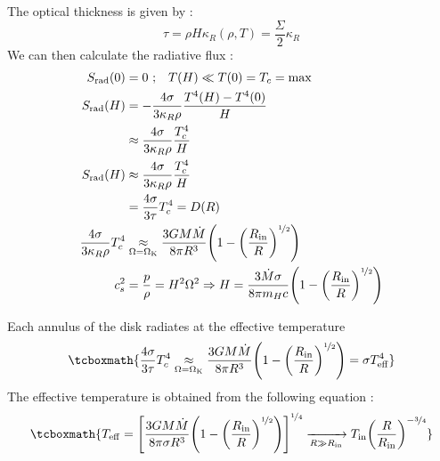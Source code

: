 \documentclass[10pt,a4paper,english]{article}
\let\originalleft\left
\let\originalright\right
\renewcommand{\left}{\mathopen{}\mathclose\bgroup\originalleft}
\renewcommand{\right}{\aftergroup\egroup\originalright}
\begin{document}
The optical thickness is given by :
\begin{equation}
    \tau = \rho H \kappa_R(\rho ,T) = \frac{\Sigma}{2} \kappa_R
\end{equation}
We can then calculate the radiative flux :
\begin{align}
    S_\mathrm{rad}(0)   & = 0 \ \mathrm{;}\quad T(H) \ll T(0) = T_c = \mathrm{max}  \\
    S_\mathrm{rad}(H) & = -\frac{4\sigma}{3\kappa_R \rho}\frac{T^4(H)-T^4(0)}{H} \\
                        & \approx \frac{4\sigma}{3\kappa_R \rho}\frac{T^4_c}{H} \\
    S_\mathrm{rad}(H) & \approx  \frac{4\sigma}{3\kappa_R \rho}\frac{T^4_c}{H}  \\
                        & = \frac{4\sigma}{3\tau}T_c^4 = D(R) \\
    \frac{4\sigma}{3\kappa_R \rho}T^4_c & \underset{\mathrm{\Omega = \Omega_K}}{\approx}
    \frac{3GM\dot{M}}{8\pi R^3}\left( 1-\left(\frac{R_\mathrm{in}}{R}\right)^{\nicefrac{1}{2}}\right) \\
    c_s^2 & = \frac{p}{\rho} = H^2\Omega^2 \Rightarrow H = \frac{3\dot{M}\sigma}{8\pi m_H c }
    \left(  1-\left(\frac{R_\mathrm{in}}{R}\right)^{\nicefrac{1}{2}} \right)
\end{align}

Each annulus of the disk radiates at the effective temperature
\begin{equation}
    \tcboxmath{
        \frac{4\sigma}{3\tau}T^4_c\underset{\mathrm{\Omega = \Omega_K}}{\approx}
        \frac{3GM\dot{M}}{8\pi R^3}\left(  1-\left(\frac{R_\mathrm{in}}{R}\right)^{\nicefrac{1}{2}}\right) =
        \sigma T_\mathrm{eff}^4
    }
\end{equation}
The effective temperature is obtained from the following equation :
\begin{equation}
    \tcboxmath{
        T_\mathrm{eff} = \left[ \frac{3GM\dot{M}}{8\pi \sigma R^3}
        \left(  1-\left(\frac{R_\mathrm{in}}{R}\right)^{\nicefrac{1}{2}}\right)\right]^{\nicefrac{1}{4}}
        \xrightarrow[R \gg R_\mathrm{in}]{}  T_\mathrm{in}\left(\frac{R}{R_\mathrm{in}}\right)^{-\nicefrac{3}{4}}
    }
\end{equation}
\end{document}
